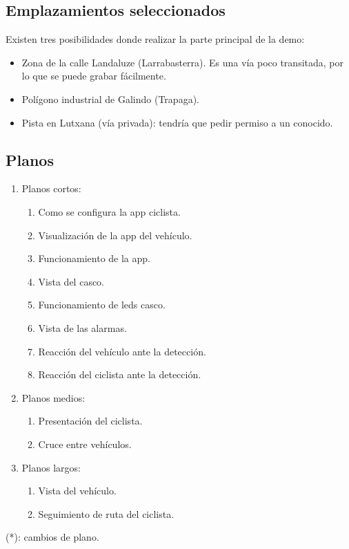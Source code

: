 \subsection{Emplazamientos seleccionados}
Existen tres posibilidades donde realizar la parte principal de la demo:
\begin{itemize}
	\item Zona de la calle Landaluze (Larrabasterra). Es una vía poco transitada,
	por lo que se puede grabar fácilmente.
	
	\item Polígono industrial de Galindo (Trapaga).
	
	\item Pista en Lutxana (vía privada): tendría que pedir permiso a un conocido.
\end{itemize}

\subsection{Planos}
\begin{enumerate}
	\item Planos cortos:
	\begin{enumerate}
		\item Como se configura la app ciclista.
		\item Visualización de la app del vehículo.
		\item Funcionamiento de la app.
		\item Vista del casco.
		\item Funcionamiento de leds casco.
		\item Vista de las alarmas.
		\item Reacción del vehículo ante la detección.
		\item Reacción del ciclista ante la detección.
	\end{enumerate}
	
	\item Planos medios:
	\begin{enumerate}
		\item Presentación del ciclista.
		\item Cruce entre vehículos.
	\end{enumerate}
	
	\item Planos largos:
	\begin{enumerate}
		\item Vista del vehículo.
		\item Seguimiento de ruta del ciclista.
	\end{enumerate}
\end{enumerate}
(*): cambios de plano.

